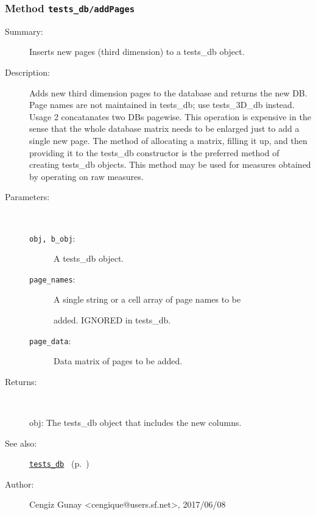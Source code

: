 \subsubsection[Method \texttt{addPages}]{Method \texttt{tests\_db/addPages}}%
%
\label{ref_tests_db__addPages}%
\hypertarget{ref_tests_db__addPages}{}%
\begin{description}
\item[Summary:]Inserts new pages (third dimension) to a tests\_db object.
%
%
\item[Description:]%
Adds new third dimension pages to the database and returns the new
 DB. Page names are not maintained in tests\_db; use tests\_3D\_db instead.
 Usage 2 concatanates two DBs pagewise. This operation is expensive in the
 sense that the whole database matrix needs to be enlarged just to add a
 single new page. The method of allocating a matrix, filling it up, and
 then providing it to the tests\_db constructor is the preferred method of
 creating tests\_db objects.  This method may be used for measures obtained
 by operating on raw measures.
\item[Parameters:]~
\begin{description}%
\item[\texttt{obj, b\_obj}:]
 A tests\_db object.
\item[\texttt{page\_names}:]
 A single string or a cell array of page names to be

added. IGNORED in tests\_db.
\item[\texttt{page\_data}:]
 Data matrix of pages to be added.
\end{description}%
%
\item[Returns:
]~

   obj: The tests\_db object that includes the new columns.
%
%
\item[See also:]%
\hyperlink{ref_tests_db}{\texttt{tests\_db}}%
\ (p.~\pageref{ref_tests_db})%
%
%
\item[Author:]%
Cengiz Gunay <cengique@users.sf.net>, 2017/06/08
%
\end{description}
\methodline%
